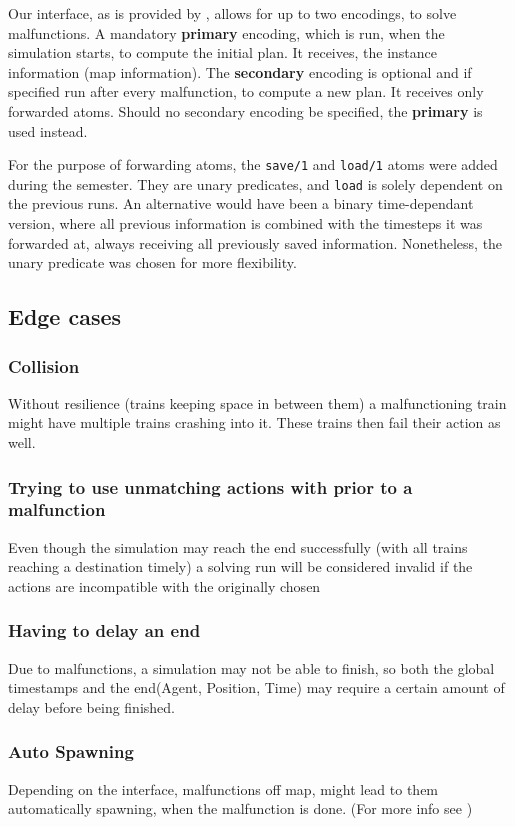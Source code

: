 Our interface, as is provided by \cite{flatland}, allows for up to two encodings, to solve malfunctions. A mandatory \textbf{primary} encoding, which is run, when the simulation starts, to compute the initial plan. It receives, the instance information (map information). The \textbf{secondary} encoding is optional and if specified run after every malfunction, to compute a new plan. It receives only forwarded atoms. Should no secondary encoding be specified, the \textbf{primary} is used instead.

For the purpose of forwarding atoms, the \texttt{save/1} and \texttt{load/1} atoms were added during the semester\cite{malfunction_branch}. They are unary predicates, and \texttt{load} is solely dependent on the previous runs. An alternative would have been a binary time-dependant version, where all previous information is combined with the timesteps it was forwarded at, always receiving all previously saved information. Nonetheless, the unary predicate was chosen for more flexibility.

\subsection{Edge cases}

\subsubsection {Collision} Without resilience (trains keeping space in between them) a malfunctioning train might have multiple trains crashing into it. These trains then fail their action as well.

\subsubsection {Trying to use unmatching actions with prior to a malfunction} Even though the simulation may reach the end successfully (with all trains reaching a destination timely) a solving run will be considered invalid if the actions are incompatible with the originally chosen

\subsubsection {Having to delay an end} Due to malfunctions, a simulation may not be able to finish, so both the global timestamps and the end(Agent, Position, Time) may require a certain amount of delay before being finished.

\subsubsection {Auto Spawning} Depending on the interface, malfunctions off map, might lead to them automatically spawning, when the malfunction is done. (For more info see \cite{malfunction_issue})

